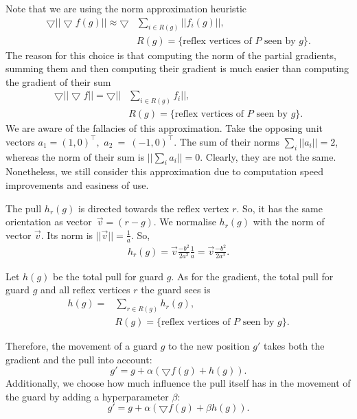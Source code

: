Note that we are using the norm approximation heuristic 
\begin{align*}
    \bigtriangledown ||\bigtriangledown f(g)|| \approx \bigtriangledown &\sum_{i \in R(g)} ||f_i(g)||, \\
    &R(g) = \{\text{reflex vertices of } P \text{ seen by } g\}. 
\end{align*}
The reason for this choice is that computing the norm of the partial gradients, summing them and then computing their gradient is much easier than computing the gradient of their sum 
\begin{align*}
    \bigtriangledown ||\bigtriangledown f|| = \bigtriangledown ||&\sum_{i \in R(g)} f_i||, \\
    &R(g) = \{\text{reflex vertices of } P \text{ seen by } g\}.
\end{align*}
We are aware of the fallacies of this approximation. Take the opposing unit vectors $a_1 = (1, 0)^\intercal,$ $a_2~=~(-1, 0)^\intercal$. The sum of their norms $\sum_i ||a_i|| = 2$, whereas the norm of their sum is $||\sum_i a_i|| = 0$. Clearly, they are not the same. Nonetheless, we still consider this approximation due to computation speed improvements and easiness of use.

\newpage
The pull $h_r(g)$ is directed towards the reflex vertex $r$. So, it has the same orientation as vector~$\vec{v} = (r - g)$. We  normalise $h_r(g)$ with the norm of vector $\vec{v}$. Its norm is $||\vec{v}|| = \frac 1 a$. So, 
\begin{align}
    h_r(g) = \vec{v}\frac{-b^2}{2a^2}\frac 1 a = \vec{v}\frac{-b^2}{2a^3}. \label{eq:h}
\end{align}

Let $h(g)$ be the total pull for guard $g$. As for the gradient, the total pull for guard $g$ and all reflex vertices $r$ the guard sees is 
\begin{align*}
    h(g) = &\sum_{r \in R(g)} h_r(g), \\
    &R(g) = \{\text{reflex vertices of $P$ seen by $g$\}}.
\end{align*}

Therefore, the movement of a guard $g$ to the new position $g'$ takes both the gradient and the pull into account: $$g' = g + \alpha (\bigtriangledown f(g) + h(g)).$$ Additionally, we  choose how much influence the pull itself has in the movement of the guard by adding a hyperparameter $\beta$: $$g' = g + \alpha (\bigtriangledown f(g) + \beta h(g)).$$

